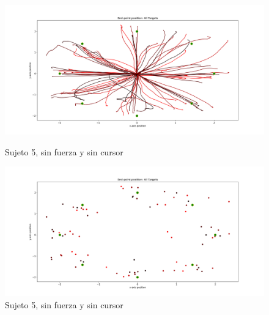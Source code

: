 \documentclass[a4paper,11pt, oneside]{book}
\begin{document}
\begin{figure}[H]
	\begin{minipage}[b]{0.5\linewidth}
		\centering
		\includegraphics[width=\linewidth]{sujeto5/no_force_no_cursor/trayectorias}
		\caption{Sujeto 5, sin fuerza y sin cursor}
		\label{fig:figura1}
	\end{minipage}
	\hspace{0.5cm}
	\begin{minipage}[b]{0.5\linewidth}
		\centering
		\includegraphics[width=\linewidth]{sujeto5/no_force_no_cursor/trayectorias_puntos}
		\caption{Sujeto 5, sin fuerza y sin cursor}
		\label{fig:figura2}
	\end{minipage}
\end{figure}
\end{document}
